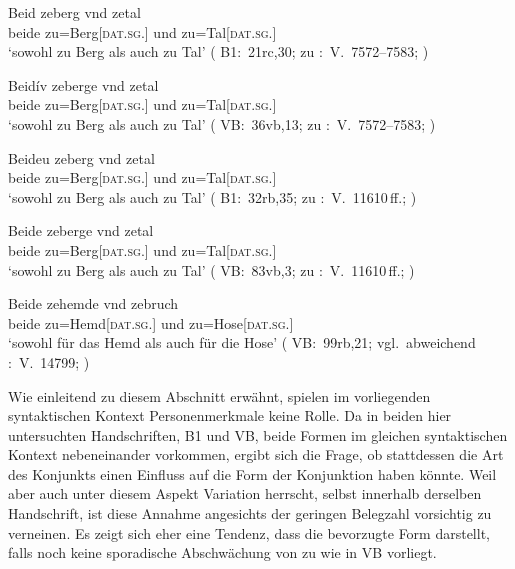 \begin{exe}
\ex \label{ex:syntintvar2}
\begin{xlist}
	\ex \label{ex:syntintvar2_1}
		\gll Beid zeberg vnd zetal \\
			beide zu=Berg[\textsc{dat.sg.\MascI}] und zu=Tal[\textsc{dat.sg.\NeutI}] \\
		\trans `sowohl zu Berg als auch zu Tal'
			(%
				B1:~21rc,30; zu
				\KC:~V.~7572--7583;
				\cite[220]{schroeder1895}%
			)

	\ex \label{ex:syntintvar2_3}
		\gll Beidív zeberge vnd zetal \\
			beide zu=Berg[\textsc{dat.sg.\MascI}] und zu=Tal[\textsc{dat.sg.\NeutI}] \\
		\trans `sowohl zu Berg als auch zu Tal'
			(%
				VB:~36vb,13; zu
				\KC:~V.~7572--7583;
				\cite[220]{schroeder1895}%
			)
\end{xlist}

\ex \label{ex:syntintvar5}
\begin{xlist}
	\ex \label{ex:syntintvar2_2}
		\gll Beideu zeberg vnd zetal \\
			beide zu=Berg[\textsc{dat.sg.\MascI}] und zu=Tal[\textsc{dat.sg.\NeutI}] \\
		\trans `sowohl zu Berg als auch zu Tal'
			(%
				B1:~32rb,35; zu
				\KC:~V.~11610\,ff.;
				\cite[293]{schroeder1895}%
			)

	\ex \label{ex:syntintvar2_4}
		\gll Beide zeberge vnd zetal \\
			beide zu=Berg[\textsc{dat.sg.\MascI}] und zu=Tal[\textsc{dat.sg.\NeutI}] \\
		\trans `sowohl zu Berg als auch zu Tal'
			(%
				VB:~83vb,3; zu
				\KC:~V.~11610\,ff.;
				\cite[293]{schroeder1895}%
			)
\end{xlist}

\ex \label{ex:syntintvar4}
	\gll Beide zehemde vnd zebruch \\
		beide zu=Hemd[\textsc{dat.sg.\NeutI}] und zu=Hose[\textsc{dat.sg.\FemI}] \\
	\trans `sowohl für das Hemd als auch für die Hose'
		(%
			VB:~99rb,21; vgl.~abweichend
			\KC:~V.~14799;
			\cite[349]{schroeder1895}
		)
\end{exe}

Wie einleitend zu diesem Abschnitt erwähnt, spielen im vorliegenden
syntaktischen Kontext Personenmerkmale keine Rolle. Da in beiden hier
untersuchten Handschriften, B1 und VB, beide Formen im
gleichen syntaktischen Kontext nebeneinander vorkommen, ergibt sich die Frage,
ob stattdessen die Art des Konjunkts einen Einfluss auf die Form der
Konjunktion haben könnte. Weil aber auch unter diesem Aspekt Variation
herrscht, selbst innerhalb derselben Handschrift, ist diese Annahme angesichts
der geringen Belegzahl vorsichtig zu verneinen. Es zeigt sich eher eine
Tendenz, dass  die bevorzugte Form darstellt, falls noch keine
sporadische Abschwächung von  zu  wie in VB
vorliegt.

